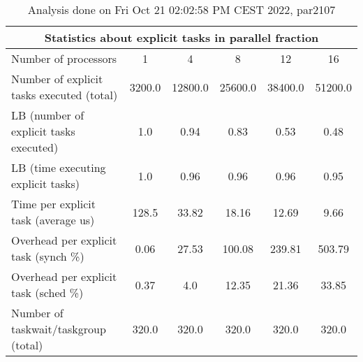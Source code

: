 \begin{table}[h]
\begin{center}
\begin{tabular}{|l|c|c|c|c|c|}
\hline
\multicolumn{6}{|c|}{Statistics about explicit tasks in parallel fraction} \\
\hline
\hline
Number of processors & 1 & 4 & 8 & 12 & 16 \\
\hline
\hline
Number of explicit tasks executed (total)        &          3200.0 &         12800.0 &         25600.0 &         38400.0 &         51200.0 \\
\hline
LB (number of explicit tasks executed)           &             1.0 &            0.94 &            0.83 &            0.53 &            0.48 \\
\hline
LB (time executing explicit tasks)               &             1.0 &            0.96 &            0.96 &            0.96 &            0.95 \\
\hline
Time per explicit task (average us)                 &           128.5 &           33.82 &           18.16 &           12.69 &            9.66 \\
\hline
Overhead per explicit task (synch \%)             &            0.06 &           27.53 &          100.08 &          239.81 &          503.79 \\
\hline
Overhead per explicit task (sched \%)             &            0.37 &             4.0 &           12.35 &           21.36 &           33.85 \\
\hline
Number of taskwait/taskgroup (total)             &           320.0 &           320.0 &           320.0 &           320.0 &           320.0 \\
\hline
\end{tabular}
\end{center}
\caption{ Analysis done on Fri Oct 21 02:02:58 PM CEST 2022, par2107}
\end{table}
